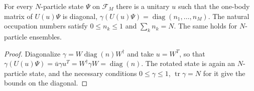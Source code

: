 \begin{theorem}\label{thm:natural-orbitals}
  \leanok
  For every $N$-particle state $\Psi$ on $\mathcal F_M$ there is a unitary $u$ such that the one-body matrix of
  $U(u)\Psi$ is diagonal, $\gamma(U(u)\Psi)=\operatorname{diag}(n_1,\dots,n_M)$. The natural occupation numbers satisfy
  $0\le n_k\le1$ and $\sum_kn_k=N$. The same holds for $N$-particle ensembles.
\end{theorem}
\begin{proof}\leanok
  Diagonalize $\gamma=W\operatorname{diag}(n)W^\dagger$ and take $u=W^T$, so that $\gamma(U(u)\Psi)=\bar u\gamma u^T=W^\dagger\gamma W
  =\operatorname{diag}(n)$. The rotated state is again an $N$-particle state, and the necessary conditions $0\le\gamma\le1$,
  $\operatorname{tr}\gamma=N$ for it give the bounds on the diagonal.
\end{proof}

